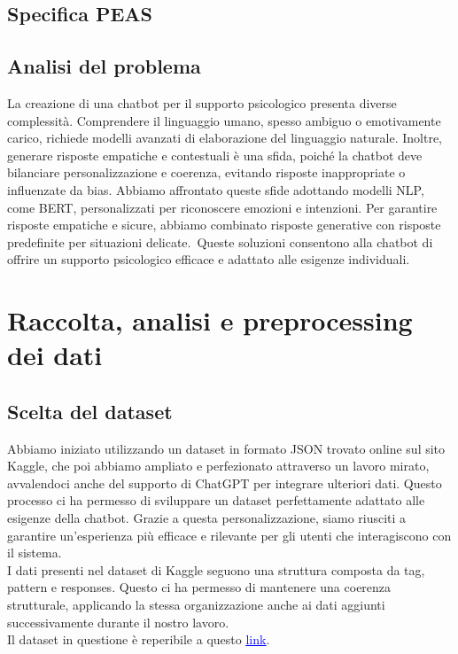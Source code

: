 \documentclass[12pt, letterpaper]{article}
\begin{document}
\subsection{Specifica PEAS}
\subsection{Analisi del problema}
La creazione di una chatbot per il supporto psicologico presenta diverse complessità. Comprendere il linguaggio umano, spesso ambiguo o emotivamente carico, richiede modelli avanzati di elaborazione del linguaggio naturale. Inoltre, generare risposte empatiche e contestuali è una sfida, poiché la chatbot deve bilanciare personalizzazione e coerenza, evitando risposte inappropriate o influenzate da bias. Abbiamo affrontato queste sfide adottando modelli NLP, come BERT, personalizzati per riconoscere emozioni e intenzioni. Per garantire risposte empatiche e sicure, abbiamo combinato risposte generative con risposte predefinite per situazioni delicate.\ Queste soluzioni consentono alla chatbot di offrire un supporto psicologico efficace e adattato alle esigenze individuali.

\section{Raccolta, analisi e preprocessing dei dati}

\subsection{Scelta del dataset}
Abbiamo iniziato utilizzando un dataset in formato JSON trovato online sul sito Kaggle, che poi abbiamo ampliato e perfezionato attraverso un lavoro mirato, avvalendoci anche del supporto di ChatGPT per integrare ulteriori dati. Questo processo ci ha permesso di sviluppare un dataset perfettamente adattato alle esigenze della chatbot. Grazie a questa personalizzazione, siamo riusciti a garantire un’esperienza più efficace e rilevante per gli utenti che interagiscono con il sistema.\\
I dati presenti nel dataset di Kaggle seguono una struttura composta da tag, pattern e responses. Questo ci ha permesso di mantenere una coerenza strutturale, applicando la stessa organizzazione anche ai dati aggiunti successivamente durante il nostro lavoro.\\
Il dataset in questione è reperibile a questo \href{https://www.kaggle.com/code/jocelyndumlao/chatbot-for-mental-health-conversations}{\textcolor{blue}{\underline{link}}}.
\end{document}
